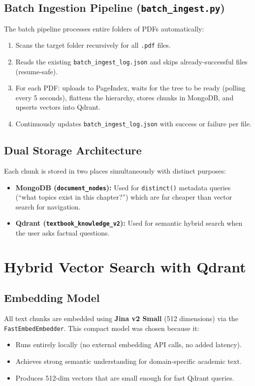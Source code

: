 \documentclass[12pt, a4paper]{article}
\begin{document}
\subsection{Batch Ingestion Pipeline (\texttt{batch\_ingest.py})}
The batch pipeline processes entire folders of PDFs automatically:
\begin{enumerate}
    \item Scans the target folder recursively for all \texttt{.pdf} files.
    \item Reads the existing \texttt{batch\_ingest\_log.json} and skips already-successful files (resume-safe).
    \item For each PDF: uploads to PageIndex, waits for the tree to be ready (polling every 5 seconds), flattens the hierarchy, stores chunks in MongoDB, and upserts vectors into Qdrant.
    \item Continuously updates \texttt{batch\_ingest\_log.json} with success or failure per file.
\end{enumerate}

\subsection{Dual Storage Architecture}
Each chunk is stored in two places simultaneously with distinct purposes:
\begin{itemize}
    \item \textbf{MongoDB (\texttt{document\_nodes}):} Used for \texttt{distinct()} metadata queries (``what topics exist in this chapter?'') which are far cheaper than vector search for navigation.
    \item \textbf{Qdrant (\texttt{textbook\_knowledge\_v2}):} Used for semantic hybrid search when the user asks factual questions.
\end{itemize}

\newpage
\section{Hybrid Vector Search with Qdrant}

\subsection{Embedding Model}
All text chunks are embedded using \textbf{Jina v2 Small} (512 dimensions) via the \texttt{FastEmbedEmbedder}. This compact model was chosen because it:
\begin{itemize}
    \item Runs entirely locally (no external embedding API calls, no added latency).
    \item Achieves strong semantic understanding for domain-specific academic text.
    \item Produces 512-dim vectors that are small enough for fast Qdrant queries.
\end{itemize}
\end{document}
